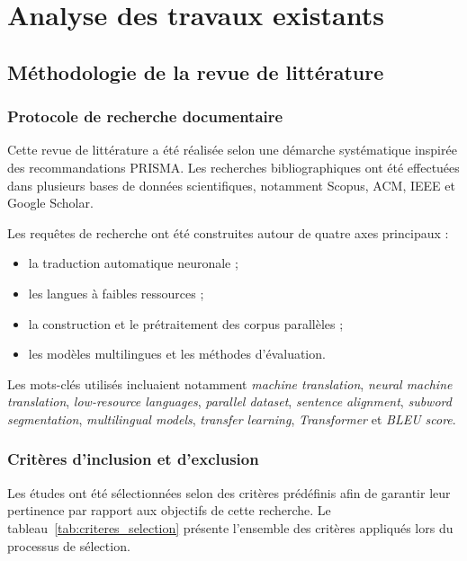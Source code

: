\section{Analyse des travaux existants}


\subsection{Méthodologie de la revue de littérature}

\subsubsection{Protocole de recherche documentaire}

Cette revue de littérature a été réalisée selon une démarche systématique inspirée des recommandations \ac{PRISMA}. Les recherches bibliographiques ont été effectuées dans plusieurs bases de données scientifiques, notamment Scopus, \ac{ACM}, \ac{IEEE} et Google Scholar.

Les requêtes de recherche ont été construites autour de quatre axes principaux :

\begin{itemize}
    \item la traduction automatique neuronale ;
    \item les langues à faibles ressources ;
    \item la construction et le prétraitement des corpus parallèles ;
    \item les modèles multilingues et les méthodes d'évaluation.
\end{itemize}

Les mots-clés utilisés incluaient notamment \textit{machine translation}, \textit{neural machine translation}, \textit{low-resource languages}, \textit{parallel dataset}, \textit{sentence alignment}, \textit{subword segmentation}, \textit{multilingual models}, \textit{transfer learning}, \textit{Transformer} et \textit{BLEU score}.

\subsubsection{Critères d'inclusion et d'exclusion}

Les études ont été sélectionnées selon des critères prédéfinis afin de garantir leur pertinence par rapport aux objectifs de cette recherche. Le tableau~\ref{tab:criteres_selection} présente l'ensemble des critères appliqués lors du processus de sélection.

